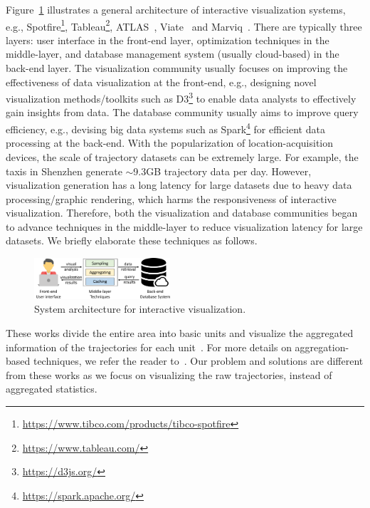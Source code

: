 Figure~\ref{fig:sys_framework} illustrates a general architecture of interactive visualization systems,
e.g., Spotfire\footnote{\url{https://www.tibco.com/products/tibco-spotfire}}, Tableau\footnote{\url{https://www.tableau.com/}}, ATLAS~\cite{chan2008maintaining}, Viate~\cite{yang2019vaite} and Marviq~\cite{dong2020marviq}.
There are typically three layers: user interface in the front-end layer, optimization techniques in the middle-layer, and database management system (usually cloud-based) in the back-end layer. The visualization community usually focuses on improving the effectiveness of data visualization at the front-end, e.g., designing novel visualization methods/toolkits such as D3\footnote{\url{https://d3js.org/}} to enable data analysts to effectively gain insights from data. 
The database community usually aims to improve query efficiency, e.g., devising big data systems such as Spark\footnote{\url{https://spark.apache.org/}} for efficient data processing at the back-end. 
With the popularization of location-acquisition devices, the scale of trajectory datasets can be extremely large. For example, the taxis in Shenzhen generate {$\sim$}9.3GB trajectory data per day. However, visualization generation has a long latency for large datasets due to heavy data processing/graphic rendering, which harms the responsiveness of interactive visualization. Therefore, both the visualization and database communities began to advance techniques in the middle-layer to reduce visualization latency for large datasets. We briefly elaborate these techniques as follows.


\begin{figure}
	\centering
	\includegraphics[width=0.45\textwidth]{pictures/framework/framework.pdf}
	\trim
	\caption{System architecture for interactive visualization.} \label{fig:sys_framework}
    \trim \trim
\end{figure}


These works divide the {entire area} into basic units and visualize the aggregated information of the trajectories for each unit~\cite{wood2010visualisation,guo2009flow,von2015mobilitygraphs}. For more details on aggregation-based techniques, we refer the reader to~\cite{andrienko2008spatio,adrienko2010spatial}. Our problem and solutions are different from these works as we focus on visualizing the raw trajectories, instead of aggregated statistics.






